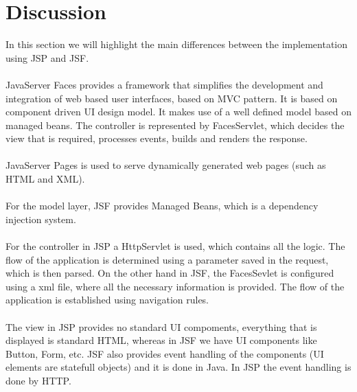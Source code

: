 \section{Discussion}
\label{sec.discussion}
In this section we will highlight the main differences between the
implementation using JSP and JSF.\\\\
JavaServer Faces provides a framework that simplifies the development and 
integration of web based user interfaces, based on MVC pattern. It is based on
component driven UI design model. It makes use of a well defined model based on managed
beans. The controller is represented by FacesServlet, which decides
the view that is required, processes events, builds
and renders the response.\\\\
JavaServer Pages is used to serve dynamically generated web pages (such as HTML
and XML).\\\\ 
For the model layer, JSF provides Managed Beans, which is a dependency injection
system.\\\\
For the controller in JSP a HttpServlet is used, which contains all the logic.
The flow of the application is determined using a parameter saved in the
request, which is then parsed. On the other hand in JSF, the FacesSevlet is
configured using a xml file, where all the necessary information is provided.
The flow of the application is established using navigation rules.
\\\\
The view in JSP provides no standard UI compoments,
everything that is displayed is standard HTML, whereas in JSF we have UI components like Button, 
Form, etc. JSF also provides event handling of the components (UI elements are statefull objects)
and it is done in Java. In JSP the event handling is done by HTTP.
